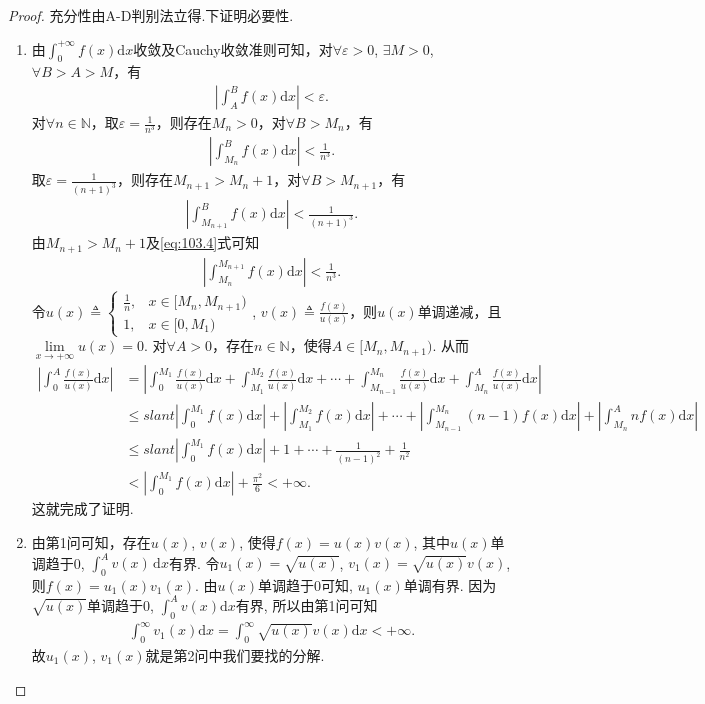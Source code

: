 \documentclass[../../main.tex]{subfiles}
\begin{document}
\begin{proof}
充分性由A-D判别法立得.下证明必要性.
\begin{enumerate}
\item 由$\int_0^{+\infty} f(x)\mathrm{d}x$收敛及Cauchy收敛准则可知，对$\forall \varepsilon >0$, $\exists M>0$, $\forall B>A>M$，有
\begin{align*}
\left| \int_A^B f(x)\mathrm{d}x \right| < \varepsilon.
\end{align*}
对$\forall n\in \mathbb{N}$，取$\varepsilon = \frac{1}{n^3}$，则存在$M_n>0$，对$\forall B>M_n$，有
\begin{align}
\left| \int_{M_n}^B f(x)\mathrm{d}x \right| < \frac{1}{n^3}. \label{eq:103.4}
\end{align}
取$\varepsilon = \frac{1}{(n+1)^3}$，则存在$M_{n+1}>M_n+1$，对$\forall B>M_{n+1}$，有
\begin{align*}
\left| \int_{M_{n+1}}^B f(x)\mathrm{d}x \right| < \frac{1}{(n+1)^3}.
\end{align*}
由$M_{n+1}>M_n+1$及\eqref{eq:103.4}式可知
\begin{align*}
\left| \int_{M_n}^{M_{n+1}} f(x)\mathrm{d}x \right| < \frac{1}{n^3}.
\end{align*}
令$u(x) \triangleq \begin{cases} 
\frac{1}{n}, & x\in [M_n, M_{n+1}) \\
1, & x\in [0, M_1)
\end{cases}$, $v(x) \triangleq \frac{f(x)}{u(x)}$，则$u(x)$单调递减，且$\lim\limits_{x\rightarrow +\infty} u(x) = 0$.
对$\forall A>0$，存在$n\in \mathbb{N}$，使得$A\in [M_n, M_{n+1})$. 从而
\begin{align*}
\left| \int_0^A \frac{f(x)}{u(x)}\mathrm{d}x \right| &= \left| \int_0^{M_1} \frac{f(x)}{u(x)}\mathrm{d}x + \int_{M_1}^{M_2} \frac{f(x)}{u(x)}\mathrm{d}x + \cdots + \int_{M_{n-1}}^{M_n} \frac{f(x)}{u(x)}\mathrm{d}x + \int_{M_n}^A \frac{f(x)}{u(x)}\mathrm{d}x \right| \\
&\leqslant slant \left| \int_0^{M_1} f(x)\mathrm{d}x \right| + \left| \int_{M_1}^{M_2} f(x)\mathrm{d}x \right| + \cdots + \left| \int_{M_{n-1}}^{M_n} (n-1)f(x)\mathrm{d}x \right| + \left| \int_{M_n}^A nf(x)\mathrm{d}x \right| \\
&\leqslant slant \left| \int_0^{M_1} f(x)\mathrm{d}x \right| + 1 + \cdots + \frac{1}{(n-1)^2} + \frac{1}{n^2} \\
&< \left| \int_0^{M_1} f(x)\mathrm{d}x \right| + \frac{\pi^2}{6} < +\infty.
\end{align*}
这就完成了证明.

\item 由第1问可知，存在$u(x)$, $v(x)$, 使得$f(x)=u(x)v(x)$, 其中$u(x)$单调趋于0, $\int_0^A v(x)\,\mathrm{d}x$有界. 令$u_1(x)=\sqrt{u(x)}$, $v_1(x)=\sqrt{u(x)}v(x)$, 则$f(x)=u_1(x)v_1(x)$. 由$u(x)$单调趋于0可知, $u_1(x)$单调有界. 因为$\sqrt{u(x)}$单调趋于0, $\int_0^A v(x)\mathrm{d}x$有界, 所以由第1问可知
\begin{align*}
\int_0^{\infty} v_1(x)\mathrm{d}x=\int_0^{\infty} \sqrt{u(x)}v(x)\mathrm{d}x<+\infty.
\end{align*}
故$u_1(x)$, $v_1(x)$就是第2问中我们要找的分解.
\end{enumerate}
\end{proof}
\end{document}

